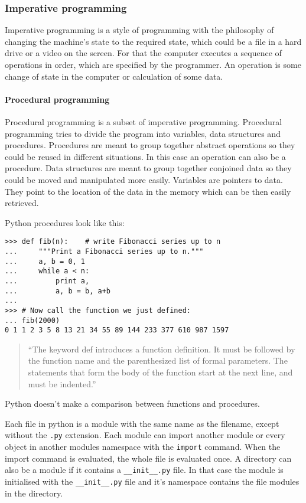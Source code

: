 \subsubsection{Imperative programming}

Imperative programming is a style of programming with the philosophy of changing the machine's state to the required state, which could be a file in a hard drive or a video on the screen. For that the computer executes a sequence of operations in order, which are specified by the programmer. An operation is some change of state in the computer or calculation of some data.

\paragraph{Procedural programming}

Procedural programming is a subset of imperative programming. Procedural
programming tries to divide the program into variables, data structures and
procedures. Procedures are meant to group together abstract operations so they
could be reused in different situations. In this case an operation can also be a
procedure. Data structures are meant to group together conjoined data so they
could be moved and manipulated more easily. Variables are pointers to data. They
point to the location of the data in the memory which can be then easily
retrieved.

Python procedures look like this:
\begin{verbatim}
>>> def fib(n):    # write Fibonacci series up to n
...     """Print a Fibonacci series up to n."""
...     a, b = 0, 1
...     while a < n:
...         print a,
...         a, b = b, a+b
...
>>> # Now call the function we just defined:
... fib(2000)
0 1 1 2 3 5 8 13 21 34 55 89 144 233 377 610 987 1597
\end{verbatim}
\begin{quote}
``The keyword def introduces a function definition. It must be followed by the
function name and the parenthesized list of formal parameters. The statements
that form the body of the function start at the next line, and must be
indented.''\cite[4.6. Defining Functions]{website:python-functions}
\end{quote}
Python doesn't make a comparison between functions and procedures.

Each file in python is a module with the same name as the filename, except without the \texttt{.py} extension. Each module can import another module or every object in another modules namespace with the \texttt{import} command. When the import command is evaluated, the whole file is evaluated once. A directory can also be a module if it contains a \texttt{\_\_init\_\_.py} file. In that case the module is initialised with the \texttt{\_\_init\_\_.py} file and it's namespace contains the file modules in the directory.

